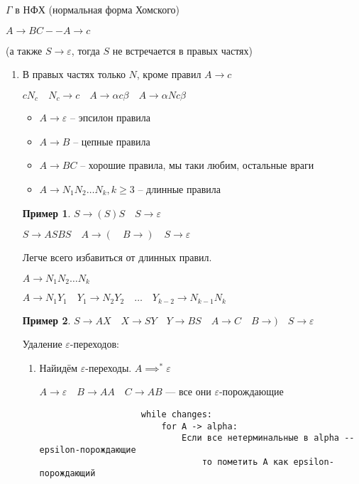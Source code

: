 \documentclass{book}
\theoremstyle{definition}
\newtheorem*{example}{Пример}
\begin{document}
\begin{definition}
    $\Gamma$ в НФХ (нормальная форма Хомского)

     $A \longrightarrow BC -- A \longrightarrow  c $

     (а также $S \to \varepsilon$, тогда $S$ не встречается в правых частях)
\end{definition}

\begin{enumerate}
    \item В правых частях только $N$, кроме правил  $A\to c$

        $c  N_c\quad N_c\to c\quad A\to \alpha c \beta\quad A \to \alpha Nc\beta$

        \begin{itemize}
            \item $A\to \varepsilon$ -- эпсилон правила
            \item $A\to B$ -- цепные правила
            \item $A\to BC$ -- хорошие правила, мы таки любим, остальные враги
            \item $A\to N_1N_2\ldots N_k, k\geqslant 3$ -- длинные правила
        \end{itemize}

        \begin{example}
            $S\to (S)S\quad S\to \varepsilon$

            $S\to ASBS\quad A\to (\quad B\to )\quad S\to \varepsilon$
        \end{example}

        Легче всего избавиться от длинных правил.

        $A\to N_1N_2\ldots N_k$

        $A\to N_1Y_1\quad Y_1\to N_2Y_2 \quad \ldots\quad Y_{k-2}\to N_{k-1}N_k$

        \begin{example}
            $S\to AX\quad X\to SY\quad Y\to BS\quad A\to C\quad B\to )\quad S\to \varepsilon$
        \end{example}

        Удаление $\varepsilon$-переходов:
        \begin{enumerate}
            \item Найидём $\varepsilon$-переходы. $A \implies ^* \varepsilon$

                $A\to \varepsilon\quad B\to A A\quad C\to AB$ --- все они $\varepsilon$-порождающие
                \begin{lstlisting}
                    while changes:
                        for A -> alpha:
                            Если все нетерминальные в alpha -- epsilon-порождающие
                                то пометить A как epsilon-порождающий
                \end{lstlisting}


\end{enumerate}
\end{enumerate}
\end{document}
